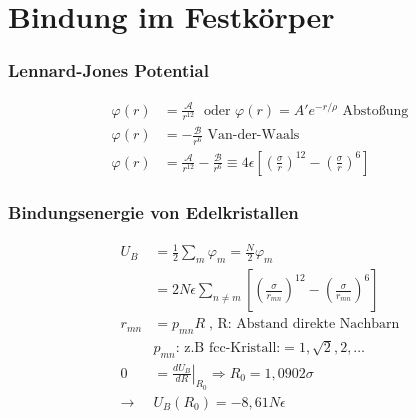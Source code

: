 \section{Bindung im Festkörper}

\subsubsection*{Lennard-Jones Potential}
\begin{equation*}
    \begin{aligned}
        \varphi(r) &= \frac{\mathcal{A}}{r^{12}} \; \text{ oder } \varphi(r) = A' e^{-r/\rho}  \text{ Abstoßung} \\
        \varphi(r) &= - \frac{\mathcal{B}}{r^6} \text{ Van-der-Waals} \\
        \varphi(r) &= \frac{\mathcal{A}}{r^{12}} - \frac{\mathcal{B}}{r^6} \equiv 4 \epsilon \left[\left(\frac{\sigma}{r}\right)^{12}-\left(\frac{\sigma}{r}\right)^6\right]
    \end{aligned}
\end{equation*}

\subsubsection*{Bindungsenergie von Edelkristallen}
\begin{equation*}
    \begin{aligned}
        U_B &= \frac{1}{2} \sum_m \varphi_m = \frac{N}{2} \varphi_m \\
            &= 2N\epsilon \sum_{n \neq m} \left[\left(\frac{\sigma}{r_{mn}}\right)^{12}- \left(\frac{\sigma}{r_{mn}}\right)^6\right] \\
        r_{mn} &= p_{mn} R \; \text{, R: Abstand direkte Nachbarn}\\
            & p_{mn} \text{: z.B fcc-Kristall:} = 1, \sqrt{2}, 2, \dots \\
        0 &= \left. \frac{dU_B}{dR} \right|_{R_0} \Rightarrow R_0 = 1,0902 \sigma \\
        \rightarrow &U_B (R_0 ) = -8,61 N \epsilon
    \end{aligned}  
\end{equation*}

